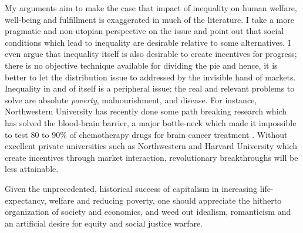 \documentclass[12pt]{article}
\newcommand{\1}{\mathbbm 1}
\begin{document}
		My arguments aim to make the case that impact of inequality on human welfare, well-being and fulfillment is exaggerated in much of the literature. I take a more pragmatic and non-utopian perspective on the issue and point out that social conditions which lead to inequality are desirable relative to some alternatives. I even argue that inequality itself is also desirable to create incentives for progress; there is no objective technique available for dividing the pie and hence, it is better to let the distribution issue to addressed by the invisible hand of markets. Inequality in and of itself is a peripheral issue; the real and relevant problems to solve are absolute \textit{poverty}, malnourishment, and disease. For instance, Northwestern University has recently done some path breaking research which has solved the blood-brain barrier, a major bottle-neck which made it impossible to test 80 to 90\% of chemotherapy drugs for brain cancer treatment \cite{schoen2022towards}. Without excellent private universities such as Northwestern and Harvard University which create incentives through market interaction, revolutionary breakthroughs will be less attainable.
		
		
		Given the unprecedented, historical success of capitalism in increasing life-expectancy, welfare and reducing poverty, one should appreciate the hitherto organization of society and economics, and weed out idealism, romanticism and an artificial desire for equity and social justice warfare.
		
	
		
		
		

		\singlespacing
		
		
		\clearpage
		
		
		
		
		
		
		\newpage
		
		
		
		
		
		
		
		
		
		
		
		
		
		
		
	
\end{document}
